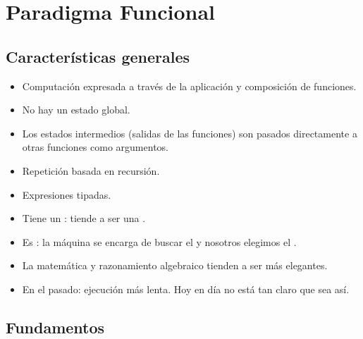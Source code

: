 \section{Paradigma Funcional}

\subsection{Características generales}

\begin{itemize}
  \item Computación expresada a través de la aplicación y composición de funciones.
  \item No hay un estado global.
  \item Los estados intermedios (salidas de las funciones) son pasados directamente a otras funciones como argumentos.
  \item Repetición basada en recursión.
  \item Expresiones tipadas.
  \item Tiene un : tiende a ser una .
  \item Es : la máquina se encarga de buscar el  y nosotros elegimos el .
  \item La matemática y razonamiento algebraico tienden a ser más elegantes.
  \item En el pasado: ejecución más lenta. Hoy en día no está tan claro que sea así.
\end{itemize}

\subsection{Fundamentos}

